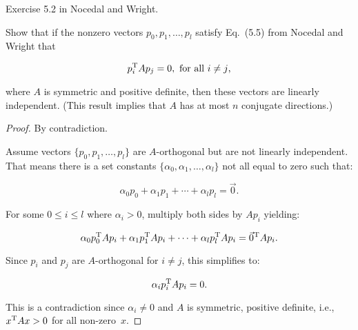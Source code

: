 \begin{problem}
  Exercise 5.2 in Nocedal and Wright.

  Show that if the nonzero vectors $p_0,p_1,\ldots,p_l$ satisfy Eq.~(5.5) from Nocedal and Wright that
  
  \[p_i^{\textnormal{T}} A p_{j} = 0, \textnormal{ for all } i \ne j\text{,}\]
  
  \noindent
  where $A$ is symmetric and positive definite, then these vectors are linearly independent. (This result implies that $A$ has at most $n$ conjugate directions.)
\end{problem}

\begin{proof} 
  By contradiction.  
  
  Assume vectors $\{p_0,p_1,\ldots,p_l\}$ are $A$-orthogonal but are not linearly independent.  That means there is a set constants $\{\alpha_0,\alpha_1,\ldots,\alpha_{l}\}$ not all equal to zero such that:
  
  \[ \alpha_{0}p_{0} + \alpha_{1}p_{1} + \cdots +\alpha_{l}p_{l} = \vec{0} \text{.}\]
  
  \noindent
  For some $0\leq i \leq l$ where $\alpha_i> 0$, multiply both sides by $Ap_i$ yielding:
  
  \[ \alpha_{0}p_{0}^{\textnormal{T}} Ap_{i} + \alpha_{1}p_{1}^{\textnormal{T}} Ap_{i} + \cdots +\alpha_{l}p_{l}^{\textnormal{T}} Ap_{i} = \vec{0}^{\textnormal{T}} Ap_{i} \text{.}\]
  
  \noindent
  Since $p_{i}$ and $p_{j}$ are $A$-orthogonal for ${i\ne j}$, this simplifies to:
  
  \[ \alpha_{i}p_{i}^{\textnormal{T}} Ap_{i} = 0 \text{.}\]
  
  \noindent 
  This is a contradiction since ${\alpha_i \ne 0}$ and $A$ is symmetric, positive definite, i.e.,~${x^{\textnormal{T}} A x > 0}$ for all non-zero~$x$.
\end{proof}

